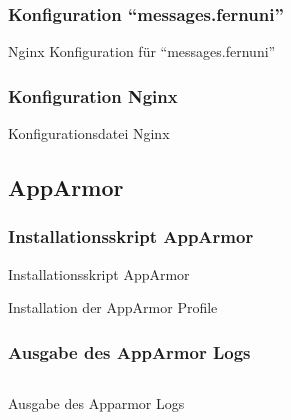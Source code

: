 \subsubsection{Konfiguration \enquote{messages.fernuni}}
\begin{longlisting}
    \caption{Nginx Konfiguration für \enquote{messages.fernuni}}
\end{longlisting}

\subsubsection{Konfiguration Nginx}
\begin{longlisting}
    \caption{Konfigurationsdatei Nginx}
\end{longlisting}

\subsection{AppArmor}
\begin{longlisting}
    \subsubsection{Installationsskript AppArmor}
    \caption{Installationsskript AppArmor}
\end{longlisting}


\begin{longlisting}{}
    \caption{Installation der AppArmor Profile}
    \label{listing:installation_apparmor}
\end{longlisting}

\subsubsection{Ausgabe des AppArmor Logs}

\begin{longlisting}
    \inputminted[fontfamily=tt,
    linenos=true,
    numberblanklines=true,
    numbersep=5pt,
    gobble=0,
    frame=leftline,
    framerule=0.4pt,
    framesep=2mm,
    funcnamehighlighting=true,
    tabsize=4,
    obeytabs=false,
    mathescape=false
    samepage=false, %
    showspaces=false,
    showtabs =false,
    texcl=false,
    breaklines=true,
    lastline=10]{text}{code/shell/apparmor.log}
    \caption{Ausgabe des Apparmor Logs}
    \label{listing:log_apparmor}
\end{longlisting}
\newpage
